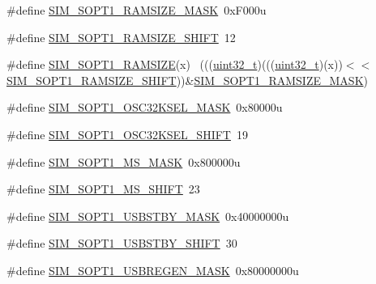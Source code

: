 \begin{DoxyCompactItemize}
\item 
\#define \hyperlink{group___s_i_m___register___masks_ga9fbcfd0b3e4fb08ee733dee975a5df29}{S\+I\+M\+\_\+\+S\+O\+P\+T1\+\_\+\+R\+A\+M\+S\+I\+Z\+E\+\_\+\+M\+A\+SK}~0x\+F000u
\item 
\#define \hyperlink{group___s_i_m___register___masks_ga4100f9e8e8ffc766ac1ac6493379b8dc}{S\+I\+M\+\_\+\+S\+O\+P\+T1\+\_\+\+R\+A\+M\+S\+I\+Z\+E\+\_\+\+S\+H\+I\+FT}~12
\item 
\#define \hyperlink{group___s_i_m___register___masks_gaf9b9b3caaa8087f8530f5c2d1418e7b0}{S\+I\+M\+\_\+\+S\+O\+P\+T1\+\_\+\+R\+A\+M\+S\+I\+ZE}(x)                                      ~(((\hyperlink{_p_e___types_8h_a33594304e786b158f3fb30289278f5af}{uint32\+\_\+t})(((\hyperlink{_p_e___types_8h_a33594304e786b158f3fb30289278f5af}{uint32\+\_\+t})(x))$<$$<$\hyperlink{group___s_i_m___register___masks_ga4100f9e8e8ffc766ac1ac6493379b8dc}{S\+I\+M\+\_\+\+S\+O\+P\+T1\+\_\+\+R\+A\+M\+S\+I\+Z\+E\+\_\+\+S\+H\+I\+FT}))\&\hyperlink{group___s_i_m___register___masks_ga9fbcfd0b3e4fb08ee733dee975a5df29}{S\+I\+M\+\_\+\+S\+O\+P\+T1\+\_\+\+R\+A\+M\+S\+I\+Z\+E\+\_\+\+M\+A\+SK})
\item 
\#define \hyperlink{group___s_i_m___register___masks_ga5c660cd4a6d8062e6ef4afbc17c27fa4}{S\+I\+M\+\_\+\+S\+O\+P\+T1\+\_\+\+O\+S\+C32\+K\+S\+E\+L\+\_\+\+M\+A\+SK}~0x80000u
\item 
\#define \hyperlink{group___s_i_m___register___masks_gac9e930c4ee375a2aee6fa6c97e061226}{S\+I\+M\+\_\+\+S\+O\+P\+T1\+\_\+\+O\+S\+C32\+K\+S\+E\+L\+\_\+\+S\+H\+I\+FT}~19
\item 
\#define \hyperlink{group___s_i_m___register___masks_ga46904a99bd3af1fdad7c0fd1222338f0}{S\+I\+M\+\_\+\+S\+O\+P\+T1\+\_\+\+M\+S\+\_\+\+M\+A\+SK}~0x800000u
\item 
\#define \hyperlink{group___s_i_m___register___masks_ga9ba067407c39191cbfac7d98e46fda61}{S\+I\+M\+\_\+\+S\+O\+P\+T1\+\_\+\+M\+S\+\_\+\+S\+H\+I\+FT}~23
\item 
\#define \hyperlink{group___s_i_m___register___masks_ga9f67cf8d4a03796048990563ac60a627}{S\+I\+M\+\_\+\+S\+O\+P\+T1\+\_\+\+U\+S\+B\+S\+T\+B\+Y\+\_\+\+M\+A\+SK}~0x40000000u
\item 
\#define \hyperlink{group___s_i_m___register___masks_ga26f72c75602df2d86c877038d60dcc73}{S\+I\+M\+\_\+\+S\+O\+P\+T1\+\_\+\+U\+S\+B\+S\+T\+B\+Y\+\_\+\+S\+H\+I\+FT}~30
\item 
\#define \hyperlink{group___s_i_m___register___masks_gac60c367119b3dcc752c4cf857b8a59b5}{S\+I\+M\+\_\+\+S\+O\+P\+T1\+\_\+\+U\+S\+B\+R\+E\+G\+E\+N\+\_\+\+M\+A\+SK}~0x80000000u
$$
\end{DoxyCompactItemize}
